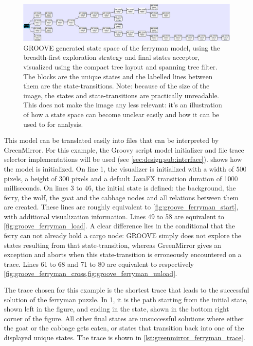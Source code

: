 \begin{figure}[h]
	\centering\includegraphics[width=\textwidth]{images/groove_ferryman_statespace}
    \caption{GROOVE generated state space of the ferryman model, using the breadth-first exploration strategy and final states acceptor, visualized using the compact tree layout and spanning tree filter. The blocks are the unique states and the labelled lines between them are the state-transitions. Note: because of the size of the image, the states and state-transitions are practically unreadable. This does not make the image any less relevant: it's an illustration of how a state space can become unclear easily and how it can be used to for analysis.}
    \label{fig:groove_ferryman_statespace}
\end{figure}
\par This model can be translated easily into files that can be interpreted by GreenMirror. For this example, the Groovy script model initializer and file trace selector implementations will be used (see \cref{sec:design;sub:interface}).  shows how the model is initialized. On line 1, the visualizer is initialized with a width of 500 pixels, a height of 300 pixels and a default JavaFX transition duration of 1000 milliseconds. On lines 3 to 46, the initial state is defined: the background, the ferry, the wolf, the goat and the cabbage nodes and all relations between them are created. These lines are roughly equivalent to \cref{fig:groove_ferryman_start}, with additional visualization information. Lines 49 to 58 are equivalent to \cref{fig:groove_ferryman_load}. A clear difference lies in the conditional that the ferry can not already hold a cargo node: GROOVE simply does not explore the states resulting from that state-transition, whereas GreenMirror gives an exception and aborts when this state-transition is erroneously encountered on a trace. Lines 61 to 68 and 71 to 80 are equivalent to respectively \cref{fig:groove_ferryman_cross,fig:groove_ferryman_unload}.

\par The trace chosen for this example is the shortest trace that leads to the successful solution of the ferryman puzzle. In \cref{fig:groove_ferryman_statespace}, it is the path starting from the initial state, shown left in the figure, and ending in the state, shown in the bottom right corner of the figure. All other final states are unsuccessful solutions where either the goat or the cabbage gets eaten, or states that transition back into one of the displayed unique states. The trace is shown in \cref{lst:greenmirror_ferryman_trace}.
